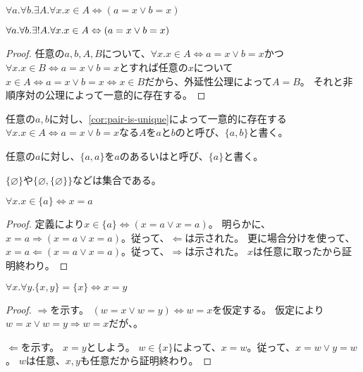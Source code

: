 \documentclass[uplatex,papersize,dvipdfmx]{jsarticle}
\begin{document}
    \begin{axiom}[非順序対の公理]
      $\forall a. \forall b. \exists A. \forall x. x \in A \Leftrightarrow (a = x \lor b = x)$
    \end{axiom}
    \begin{corollary}
      \label{cor:pair-is-unique}
      $\forall a. \forall b. \exists! A. \forall x. x \in A \Leftrightarrow (a = x \lor b = x)$
      \begin{proof}
       任意の$a, b, A, B$について、$\forall x. x \in A \Leftrightarrow a = x \lor b = x$かつ$\forall x. x \in B \Leftrightarrow a = x \lor b = x$とすれば任意の$x$について$x \in A \iff a = x \lor b = x \iff x \in B$だから、外延性公理によって$A = B$。
       それと非順序対の公理によって一意的に存在する。
      \end{proof}
    \end{corollary}
    \begin{definition}[非順序対]
      任意の$a, b$に対し、\ref{cor:pair-is-unique}によって一意的に存在する$\forall x. x \in A \Leftrightarrow a = x \lor b = x$なる$A$を$a$と$b$のと呼び、$\{a, b\}$と書く。
    \end{definition}
    \begin{definition}[単元集合]
      任意の$a$に対し、$\{a, a\}$を$a$のあるいはと呼び、$\{a\}$と書く。
    \end{definition}
    \begin{example}
      $\{\varnothing\}$や$\{\varnothing, \{\varnothing\}\}$などは集合である。
    \end{example}
    \begin{corollary}
      $\forall x. x \in \{a\} \Leftrightarrow x = a$
      \begin{proof}
        定義により$x \in \{a\} \Leftrightarrow (x = a \lor x = a)$。
        明らかに、$x = a \Rightarrow (x = a \lor x = a)$。従って、$\Leftarrow$は示された。
        更に場合分けを使って、$x = a \Leftarrow (x = a \lor x = a)$。従って、$\Rightarrow$は示された。
        $x$は任意に取ったから証明終わり。
      \end{proof}
    \end{corollary}
    \begin{corollary}
      $\forall x. \forall y. \{x, y\} = \{x\} \Leftrightarrow x = y$
      \begin{proof}
        $\Rightarrow$を示す。
        $(w = x \lor w = y) \Leftrightarrow w = x$を仮定する。
        仮定により$w = x \lor w = y \Rightarrow w = x$だが、。

        $\Leftarrow$を示す。
        $x = y$としよう。
        $w \in \{x\}$によって、$x = w$。従って、$x = w \lor y = w$。
        $w$は任意、$x, y$も任意だから証明終わり。
      \end{proof}
    \end{corollary}
\end{document}
